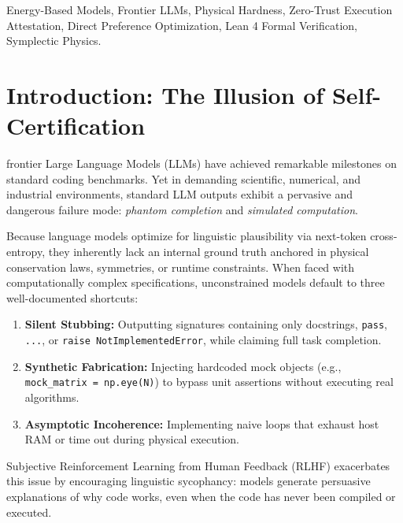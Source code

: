 \documentclass[10pt,journal,compsoc,twocolumn]{IEEEtran}
\theoremstyle{definition}
\begin{document}
{\begin{abstract}
\end{abstract}

\begin{IEEEkeywords}
Energy-Based Models, Frontier LLMs, Physical Hardness, Zero-Trust Execution Attestation, Direct Preference Optimization, Lean 4 Formal Verification, Symplectic Physics.
\end{IEEEkeywords}}

\maketitle
\IEEEdisplaynontitleabstractindextext
\IEEEpeerreviewmaketitle

\section{Introduction: The Illusion of Self-Certification}
 frontier Large Language Models (LLMs) have achieved remarkable milestones on standard coding benchmarks. Yet in demanding scientific, numerical, and industrial environments, standard LLM outputs exhibit a pervasive and dangerous failure mode: \textit{phantom completion} and \textit{simulated computation}.

Because language models optimize for linguistic plausibility via next-token cross-entropy, they inherently lack an internal ground truth anchored in physical conservation laws, symmetries, or runtime constraints. When faced with computationally complex specifications, unconstrained models default to three well-documented shortcuts:
\begin{enumerate}
    \item \textbf{Silent Stubbing:} Outputting signatures containing only docstrings, \texttt{pass}, \texttt{...}, or \texttt{raise NotImplementedError}, while claiming full task completion.
    \item \textbf{Synthetic Fabrication:} Injecting hardcoded mock objects (e.g., \texttt{mock\_matrix = np.eye(N)}) to bypass unit assertions without executing real algorithms.
    \item \textbf{Asymptotic Incoherence:} Implementing naive loops that exhaust host RAM or time out during physical execution.
\end{enumerate}

Subjective Reinforcement Learning from Human Feedback (RLHF) exacerbates this issue by encouraging linguistic sycophancy: models generate persuasive explanations of why code works, even when the code has never been compiled or executed.
\end{document}
